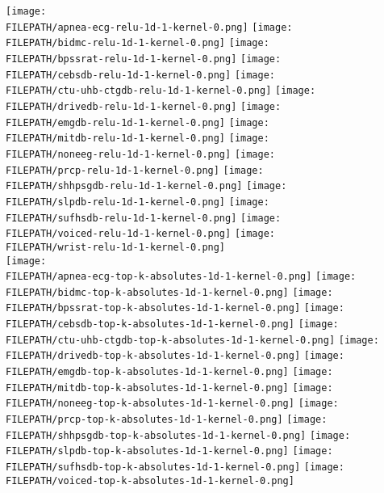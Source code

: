 \documentclass[journal]{IEEEtran}
\providecommand{\FILEPATH}{~/github.com/pbizopoulos/sparsely-activated-networks/packages/default/tmp}
\begin{document}
\begin{figure*}[!t]
  \centering
  \texttt{[image: \\FILEPATH/apnea-ecg-relu-1d-1-kernel-0.png]}
  \texttt{[image: \\FILEPATH/bidmc-relu-1d-1-kernel-0.png]}
  \texttt{[image: \\FILEPATH/bpssrat-relu-1d-1-kernel-0.png]}
  \texttt{[image: \\FILEPATH/cebsdb-relu-1d-1-kernel-0.png]}
  \texttt{[image: \\FILEPATH/ctu-uhb-ctgdb-relu-1d-1-kernel-0.png]}
  \texttt{[image: \\FILEPATH/drivedb-relu-1d-1-kernel-0.png]}
  \texttt{[image: \\FILEPATH/emgdb-relu-1d-1-kernel-0.png]}
  \texttt{[image: \\FILEPATH/mitdb-relu-1d-1-kernel-0.png]}
  \texttt{[image: \\FILEPATH/noneeg-relu-1d-1-kernel-0.png]}
  \texttt{[image: \\FILEPATH/prcp-relu-1d-1-kernel-0.png]}
  \texttt{[image: \\FILEPATH/shhpsgdb-relu-1d-1-kernel-0.png]}
  \texttt{[image: \\FILEPATH/slpdb-relu-1d-1-kernel-0.png]}
  \texttt{[image: \\FILEPATH/sufhsdb-relu-1d-1-kernel-0.png]}
  \texttt{[image: \\FILEPATH/voiced-relu-1d-1-kernel-0.png]}
  \texttt{[image: \\FILEPATH/wrist-relu-1d-1-kernel-0.png]}
  \\
  \texttt{[image: \\FILEPATH/apnea-ecg-top-k-absolutes-1d-1-kernel-0.png]}
  \texttt{[image: \\FILEPATH/bidmc-top-k-absolutes-1d-1-kernel-0.png]}
  \texttt{[image: \\FILEPATH/bpssrat-top-k-absolutes-1d-1-kernel-0.png]}
  \texttt{[image: \\FILEPATH/cebsdb-top-k-absolutes-1d-1-kernel-0.png]}
  \texttt{[image: \\FILEPATH/ctu-uhb-ctgdb-top-k-absolutes-1d-1-kernel-0.png]}
  \texttt{[image: \\FILEPATH/drivedb-top-k-absolutes-1d-1-kernel-0.png]}
  \texttt{[image: \\FILEPATH/emgdb-top-k-absolutes-1d-1-kernel-0.png]}
  \texttt{[image: \\FILEPATH/mitdb-top-k-absolutes-1d-1-kernel-0.png]}
  \texttt{[image: \\FILEPATH/noneeg-top-k-absolutes-1d-1-kernel-0.png]}
  \texttt{[image: \\FILEPATH/prcp-top-k-absolutes-1d-1-kernel-0.png]}
  \texttt{[image: \\FILEPATH/shhpsgdb-top-k-absolutes-1d-1-kernel-0.png]}
  \texttt{[image: \\FILEPATH/slpdb-top-k-absolutes-1d-1-kernel-0.png]}
  \texttt{[image: \\FILEPATH/sufhsdb-top-k-absolutes-1d-1-kernel-0.png]}
  \texttt{[image: \\FILEPATH/voiced-top-k-absolutes-1d-1-kernel-0.png]}

\end{figure*}
\end{document}
